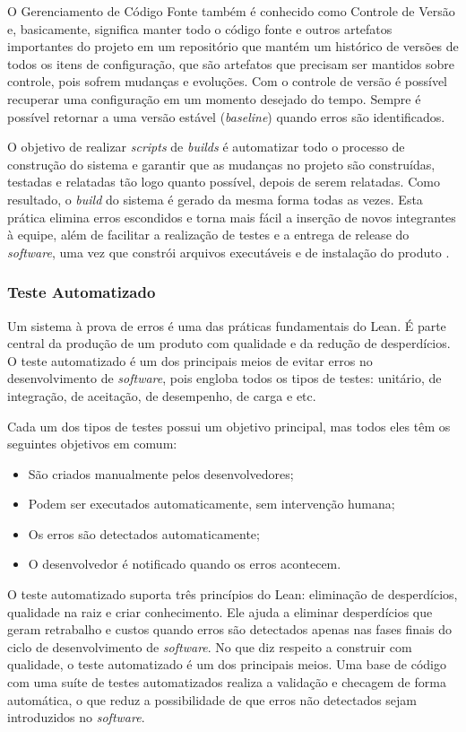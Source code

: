 O Gerenciamento de Código Fonte também é conhecido como Controle de Versão e, basicamente, significa manter todo o código fonte e outros artefatos importantes do projeto em um repositório que mantém um histórico de versões de todos os itens de configuração, que são artefatos que precisam ser mantidos sobre controle, pois sofrem mudanças e evoluções. Com o controle de versão é possível recuperar uma configuração em um momento desejado do tempo. Sempre é possível retornar a uma versão estável (\textit{baseline}) quando erros são identificados.

O objetivo de realizar \textit{scripts} de \textit{builds} é automatizar todo o processo de construção do sistema e garantir que as mudanças no projeto são construídas, testadas e relatadas tão logo quanto possível, depois de serem relatadas. Como resultado, o \textit{build} do sistema é gerado da mesma forma todas as vezes. Esta prática elimina erros escondidos e torna mais fácil a inserção de novos integrantes à equipe, além de facilitar a realização de testes e a entrega de release do \textit{software}, uma vez que constrói arquivos executáveis e de instalação do produto \cite{hibbs2009}.

\subsubsection[Teste Automatizado]{Teste Automatizado}

Um sistema à prova de erros é uma das práticas fundamentais do Lean. É parte central da produção de um produto com qualidade e da redução de desperdícios. O teste automatizado é um dos principais meios de evitar erros no desenvolvimento de \textit{software}, pois engloba todos os tipos de testes: unitário, de integração, de aceitação, de desempenho, de carga e etc.

Cada um dos tipos de testes possui um objetivo principal, mas todos eles têm os seguintes objetivos em comum:
\begin{itemize}
\item São criados manualmente pelos desenvolvedores;
\item Podem ser executados automaticamente, sem intervenção humana;
\item Os erros são detectados automaticamente;
\item O desenvolvedor é notificado quando os erros acontecem.
\end{itemize}

O teste automatizado suporta três princípios do Lean: eliminação de desperdícios, qualidade na raiz e criar conhecimento. Ele ajuda a eliminar desperdícios que geram retrabalho e custos quando erros são detectados apenas nas fases finais do ciclo de desenvolvimento de \textit{software}. No que diz respeito a construir com qualidade, o teste automatizado é um dos principais meios. Uma base de código com uma suíte de testes automatizados realiza a validação e checagem de forma automática, o que reduz a possibilidade de que erros não detectados sejam introduzidos no \textit{software}.

